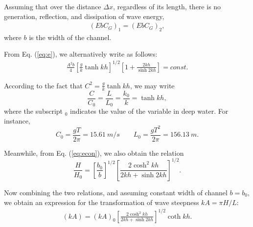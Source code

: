 \documentclass[11pt, a4paper]{article}
\begin{document}
	Assuming that over the distance $\Delta x$, regardless of its length, there 
	is no generation, reflection, and dissipation of wave energy, 
	\begin{align*}
		(EbC_G)_1=(EbC_G)_2,
	\end{align*}
	where $b$ is the width of the channel.
	
	From Eq. (\ref{eq:e}), we alternatively write as follows:
	\begin{align}
		\label{eq:econ}
		\frac{A^2 b}{4}\left[\frac{g}{k}\tanh 
		kh\right]^{1/2}\left[1+\frac{2kh}{\sinh 2kh}\right]=\textit{const.}
	\end{align}
	
	According to the fact that $C^2=\frac{g}{k}\tanh kh$, we may write
	\begin{equation}
		\frac{C}{C_0}=\frac{L}{L_0}=\frac{k_0}{k}=\tanh kh,
	\end{equation}
	where the subscript $_0$ indicates the value of the variable in deep water. 
	For instance, 	
	\begin{equation}
		C_0=\frac{gT}{2\pi}=\SI{15.61}{m/s} \qquad 
		L_0=\frac{gT^2}{2\pi}=\SI{156.13}{m}.
	\end{equation}
	
	Meanwhile, from Eq. (\ref{eq:econ}), we also obtain the relation
	\begin{equation}
		\frac{H}{H_0}=\left[\frac{b_0}{b}\right]^{1/2}\left[\frac{2\cosh^2 
		kh}{2kh+\sinh 2kh}\right]^{1/2}.
	\end{equation}
	
	Now combining the two relations, and assuming constant width of channel 
	$b=b_0$, we obtain an expression for the 
	transformation of wave steepness $kA=\pi H/L$:
	\begin{align}
		(kA)=(kA)_0\left[\frac{2\cosh^2 
		kh}{2kh+\sinh 2kh}\right]^{1/2}\coth kh.
	\end{align}
	
\end{document}
